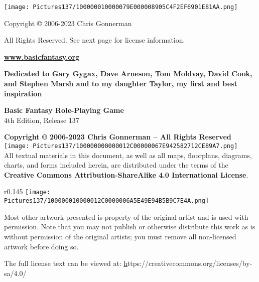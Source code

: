 \documentclass[a4paper,twoside,openany,10pt]{book}
\begin{document}
	
\justifying
\thispagestyle{empty}

\begin{center}
\texttt{[image: Pictures137/100000010000079E000008905C4F2EF6901E81AA.png]}
\end{center}

\begin{center}

{{\huge Copyright © 2006-2023 Chris Gonnerman}}\bigskip

{\LARGE All Rights Reserved. See next page for license information}.\bigskip

{\LARGE \href{https://www.basicfantasy.org}{\textbf{www.basicfantasy.org}}}\bigskip
 
\end{center}

\pagebreak

\thispagestyle{empty}

\begin{center}
\textbf{Dedicated to Gary Gygax, Dave Arneson, Tom Moldvay, David Cook, and Stephen Marsh and to my daughter Taylor, my first and best inspiration}
\end{center}

\addvspace{1.5cm}

{\large \textbf{Basic Fantasy Role-Playing Game}}\\

{\large 4th Edition, Release 137}

\textbf{Copyright © 2006-2023 Chris Gonnerman -- All Rights Reserved}
\hfill
\texttt{[image: Pictures137/100000000000012C00000067E942582712CE89A7.png]}\\

All textual materials in this document, as well as all maps, floorplans, diagrams, charts, and forms included herein, are distributed under the terms of the \textbf{Creative Commons Attribution-ShareAlike 4.0 International License}.
\begin{wrapfigure}{r}{0.145\textwidth}
	\texttt{[image: Pictures137/100000010000012C0000006A5E49E94B5B9C7E4A.png]}
\end{wrapfigure}

Most other artwork presented is property of the original artist and is used with permission. Note that you may not publish or otherwise distribute this work as is without permission of the original artists; you must remove all non-licensed artwork before doing so.

The full license text can be viewed at:  \href{https://creativecommons.org/licenses/by-sa/4.0/} https://creativecommons.org/licenses/by-sa/4.0/\\
\end{document}
